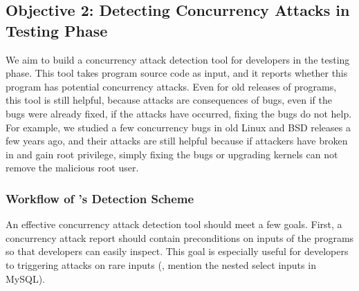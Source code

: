 





\vspace{-.15in}\subsection{Objective 2: Detecting Concurrency Attacks in Testing 
Phase}\label{sec:detect}\vspace{-.075in}

We aim to build a concurrency attack detection tool for developers in the 
testing phase. This tool takes program source code as input, and it reports 
whether this program has potential concurrency attacks. Even for old releases 
of programs, this tool is still helpful, because attacks are consequences of 
bugs, even if the bugs were already fixed, if the attacks have occurred, fixing 
the bugs do not help. For example, we studied a few concurrency bugs in old 
Linux and BSD releases a few years ago, and their attacks are still helpful 
because if attackers have broken in and gain root privilege, simply fixing the 
bugs or upgrading kernels can not remove the malicious root user.

\vspace{-.15in}\subsubsection{Workflow of \xxx's Detection Scheme}
\label{sec:detect-arch}\vspace{-.075in}

An effective concurrency attack detection tool should meet a few goals. First, 
a concurrency attack report should contain preconditions on inputs of the 
programs so that developers can easily inspect. This goal is especially useful 
for developers to triggering attacks on rare inputs (\eg, mention the nested 
select inputs in MySQL).

